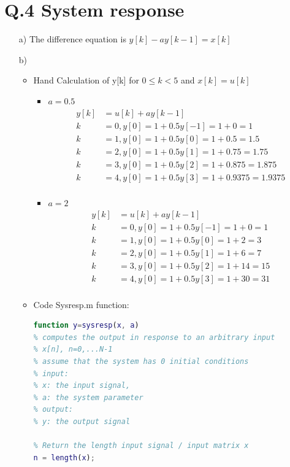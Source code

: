 \documentclass{article}
\begin{document}
	\section*{Q.4 System response}
	\begin{enumerate}
		\item[a)] The difference equation is $y[k] - ay[k-1] = x[k]$
		\item[b)] 
			\begin{itemize}
				\item Hand Calculation of y[k] for $0 \leq k<5$ and $x[k] = u[k]$
				\begin{itemize}
					\item $a=0.5$
					\begin{align*}
						y[k] &= u[k] + ay[k-1] \\
						k &= 0, y[0] = 1 + 0.5y[-1] = 1 + 0 = 1 \\
						k &= 1, y[0] = 1 + 0.5y[0] = 1 + 0.5 = 1.5 \\
						k &= 2, y[0] = 1 + 0.5y[1] = 1 + 0.75 = 1.75 \\
						k &= 3, y[0] = 1 + 0.5y[2] = 1 + 0.875 = 1.875 \\				
						k &= 4, y[0] = 1 + 0.5y[3] = 1 + 0.9375 = 1.9375 \\				
					\end{align*}
					\item $a=2$
					\begin{align*}
						y[k] &= u[k] + ay[k-1] \\
						k &= 0, y[0] = 1 + 0.5y[-1] = 1 + 0 = 1 \\
						k &= 1, y[0] = 1 + 0.5y[0] = 1 + 2 = 3 \\
						k &= 2, y[0] = 1 + 0.5y[1] = 1 + 6 = 7 \\
						k &= 3, y[0] = 1 + 0.5y[2] = 1 + 14 = 15 \\				
						k &= 4, y[0] = 1 + 0.5y[3] = 1 + 30 = 31 \\					
					\end{align*}
				\end{itemize}
				\item Code Sysresp.m function:
\begin{lstlisting}[language=Matlab]
function y=sysresp(x, a)
% computes the output in response to an arbitrary input 
% x[n], n=0,...N-1
% assume that the system has 0 initial conditions
% input:
% x: the input signal,
% a: the system parameter
% output:
% y: the output signal

% Return the length input signal / input matrix x
n = length(x);


\end{lstlisting}
\end{itemize}
\end{enumerate}
\end{document}
